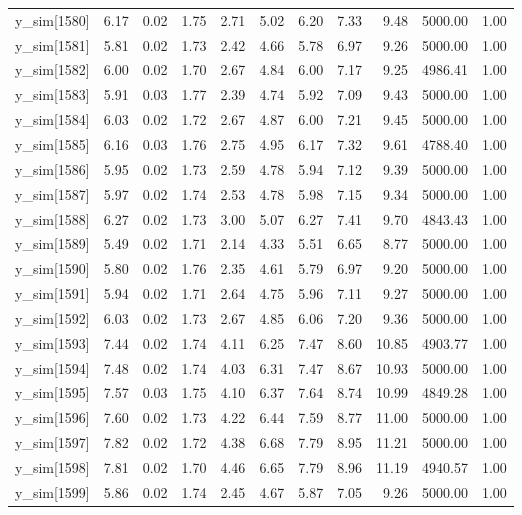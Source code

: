 \begin{table}[ht]
\begin{tabular}{rrrrrrrrrrr}
  y\_sim[1580] & 6.17 & 0.02 & 1.75 & 2.71 & 5.02 & 6.20 & 7.33 & 9.48 & 5000.00 & 1.00 \\ 
  y\_sim[1581] & 5.81 & 0.02 & 1.73 & 2.42 & 4.66 & 5.78 & 6.97 & 9.26 & 5000.00 & 1.00 \\ 
  y\_sim[1582] & 6.00 & 0.02 & 1.70 & 2.67 & 4.84 & 6.00 & 7.17 & 9.25 & 4986.41 & 1.00 \\ 
  y\_sim[1583] & 5.91 & 0.03 & 1.77 & 2.39 & 4.74 & 5.92 & 7.09 & 9.43 & 5000.00 & 1.00 \\ 
  y\_sim[1584] & 6.03 & 0.02 & 1.72 & 2.67 & 4.87 & 6.00 & 7.21 & 9.45 & 5000.00 & 1.00 \\ 
  y\_sim[1585] & 6.16 & 0.03 & 1.76 & 2.75 & 4.95 & 6.17 & 7.32 & 9.61 & 4788.40 & 1.00 \\ 
  y\_sim[1586] & 5.95 & 0.02 & 1.73 & 2.59 & 4.78 & 5.94 & 7.12 & 9.39 & 5000.00 & 1.00 \\ 
  y\_sim[1587] & 5.97 & 0.02 & 1.74 & 2.53 & 4.78 & 5.98 & 7.15 & 9.34 & 5000.00 & 1.00 \\ 
  y\_sim[1588] & 6.27 & 0.02 & 1.73 & 3.00 & 5.07 & 6.27 & 7.41 & 9.70 & 4843.43 & 1.00 \\ 
  y\_sim[1589] & 5.49 & 0.02 & 1.71 & 2.14 & 4.33 & 5.51 & 6.65 & 8.77 & 5000.00 & 1.00 \\ 
  y\_sim[1590] & 5.80 & 0.02 & 1.76 & 2.35 & 4.61 & 5.79 & 6.97 & 9.20 & 5000.00 & 1.00 \\ 
  y\_sim[1591] & 5.94 & 0.02 & 1.71 & 2.64 & 4.75 & 5.96 & 7.11 & 9.27 & 5000.00 & 1.00 \\ 
  y\_sim[1592] & 6.03 & 0.02 & 1.73 & 2.67 & 4.85 & 6.06 & 7.20 & 9.36 & 5000.00 & 1.00 \\ 
  y\_sim[1593] & 7.44 & 0.02 & 1.74 & 4.11 & 6.25 & 7.47 & 8.60 & 10.85 & 4903.77 & 1.00 \\ 
  y\_sim[1594] & 7.48 & 0.02 & 1.74 & 4.03 & 6.31 & 7.47 & 8.67 & 10.93 & 5000.00 & 1.00 \\ 
  y\_sim[1595] & 7.57 & 0.03 & 1.75 & 4.10 & 6.37 & 7.64 & 8.74 & 10.99 & 4849.28 & 1.00 \\ 
  y\_sim[1596] & 7.60 & 0.02 & 1.73 & 4.22 & 6.44 & 7.59 & 8.77 & 11.00 & 5000.00 & 1.00 \\ 
  y\_sim[1597] & 7.82 & 0.02 & 1.72 & 4.38 & 6.68 & 7.79 & 8.95 & 11.21 & 5000.00 & 1.00 \\ 
  y\_sim[1598] & 7.81 & 0.02 & 1.70 & 4.46 & 6.65 & 7.79 & 8.96 & 11.19 & 4940.57 & 1.00 \\ 
  y\_sim[1599] & 5.86 & 0.02 & 1.74 & 2.45 & 4.67 & 5.87 & 7.05 & 9.26 & 5000.00 & 1.00 \\ 

\end{tabular}
\end{table}
